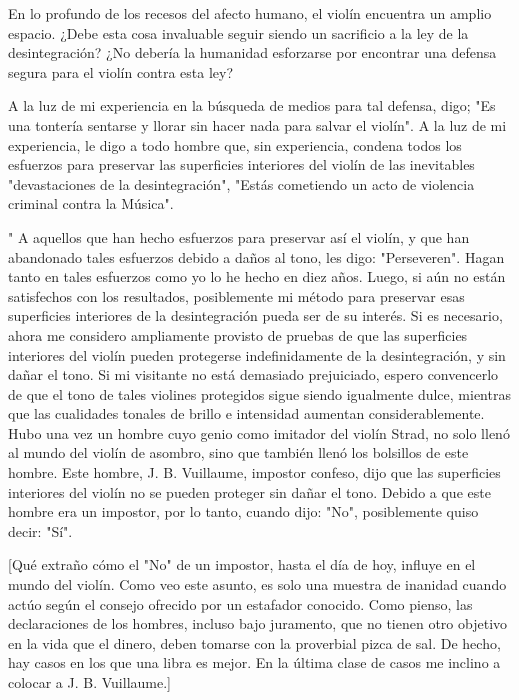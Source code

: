 \documentclass[12pt]{book}
\begin{document}
En lo profundo de los recesos del afecto humano, el violín encuentra un amplio espacio. ¿Debe esta cosa invaluable seguir siendo un sacrificio a la ley de la desintegración? ¿No debería la humanidad esforzarse por encontrar una defensa segura para el violín contra esta ley?

A la luz de mi experiencia en la búsqueda de medios para tal defensa, digo; "Es una tontería sentarse y llorar sin hacer nada para salvar el violín". A la luz de mi experiencia, le digo a todo hombre que, sin experiencia, condena todos los esfuerzos para preservar las superficies interiores del violín de las inevitables "devastaciones de la desintegración", "Estás cometiendo un acto de violencia criminal contra la Música".

" A aquellos que han hecho esfuerzos para preservar así el violín, y que han abandonado tales esfuerzos debido a daños al tono, les digo: "Perseveren". Hagan tanto en tales esfuerzos como yo lo he hecho en diez años. Luego, si aún no están satisfechos con los resultados, posiblemente mi método para preservar esas superficies interiores de la desintegración pueda ser de su interés. Si es necesario, ahora me considero ampliamente provisto de pruebas de que las superficies interiores del violín pueden protegerse indefinidamente de la desintegración, y sin dañar el tono. Si mi visitante no está demasiado prejuiciado, espero convencerlo de que el tono de tales violines protegidos sigue siendo igualmente dulce, mientras que las cualidades tonales de brillo e intensidad aumentan considerablemente. Hubo una vez un hombre cuyo genio como imitador del violín Strad, no solo llenó al mundo del violín de asombro, sino que también llenó los bolsillos de este hombre. Este hombre, J. B. Vuillaume, impostor confeso, dijo que las superficies interiores del violín no se pueden proteger sin dañar el tono. Debido a que este hombre era un impostor, por lo tanto, cuando dijo: "No", posiblemente quiso decir: "Sí".

[Qué extraño cómo el "No" de un impostor, hasta el día de hoy, influye en el mundo del violín. Como veo este asunto, es solo una muestra de inanidad cuando actúo según el consejo ofrecido por un estafador conocido. Como pienso, las declaraciones de los hombres, incluso bajo juramento, que no tienen otro objetivo en la vida que el dinero, deben tomarse con la proverbial pizca de sal. De hecho, hay casos en los que una libra es mejor. En la última clase de casos me inclino a colocar a J. B. Vuillaume.]
\end{document}
